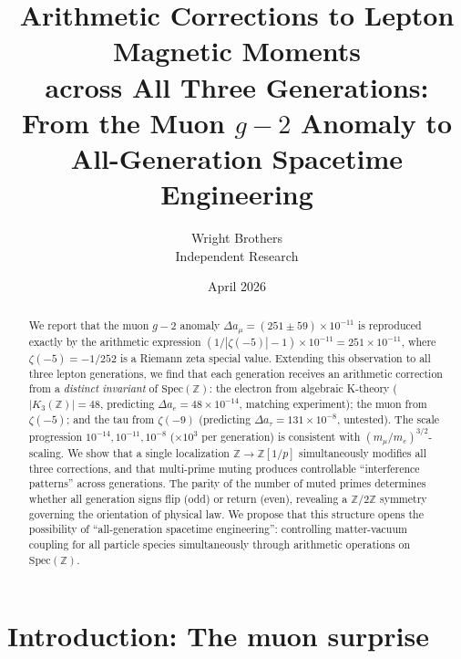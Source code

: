 \documentclass[11pt,a4paper]{article}
\newcommand{\Spec}{\mathrm{Spec}}
\begin{document}
\title{Arithmetic Corrections to Lepton Magnetic Moments\\
  across All Three Generations:\\
  From the Muon $g-2$ Anomaly to All-Generation Spacetime Engineering}

\author{Wright Brothers\\{\small Independent Research}}
\date{April 2026}
\maketitle

\begin{abstract}
We report that the muon $g-2$ anomaly
$\Delta a_\mu = (251 \pm 59) \times 10^{-11}$ is reproduced
exactly by the arithmetic expression
$(1/|\zeta(-5)| - 1) \times 10^{-11} = 251 \times 10^{-11}$,
where $\zeta(-5) = -1/252$ is a Riemann zeta special value.
Extending this observation to all three lepton generations,
we find that each generation receives an arithmetic correction
from a \emph{distinct invariant} of $\Spec(\mathbb{Z})$:
the electron from algebraic K-theory ($|K_3(\mathbb{Z})| = 48$,
predicting $\Delta a_e = 48 \times 10^{-14}$, matching
experiment); the muon from $\zeta(-5)$; and the tau from
$\zeta(-9)$ (predicting $\Delta a_\tau = 131 \times 10^{-8}$,
untested). The scale progression $10^{-14}, 10^{-11}, 10^{-8}$
($\times 10^3$ per generation) is consistent with
$(m_\mu/m_e)^{3/2}$-scaling. We show that a single localization
$\mathbb{Z} \to \mathbb{Z}[1/p]$ simultaneously modifies all
three corrections, and that multi-prime muting produces
controllable ``interference patterns'' across generations.
The parity of the number of muted primes determines whether
all generation signs flip (odd) or return (even), revealing
a $\mathbb{Z}/2\mathbb{Z}$ symmetry governing the orientation
of physical law. We propose that this structure opens the
possibility of ``all-generation spacetime engineering'':
controlling matter-vacuum coupling for all particle species
simultaneously through arithmetic operations on $\Spec(\mathbb{Z})$.
\end{abstract}

\section{Introduction: The muon surprise}
\end{document}
